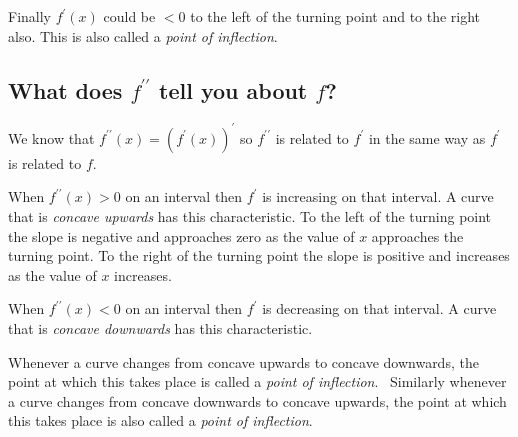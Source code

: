 Finally $f^{ \prime } (x)$ could be $ <0$ to the left of the turning point and to the right also. This is also called a \emph{point
of inflection}. 

\subsection{What does $f^{ \prime  \prime }$ tell you about $f$?}
We know that $f^{ \prime  \prime } (x) =\left (f^{ \prime } (x)\right )^{ \prime }$ so $f^{ \prime  \prime }$ is related to $f^{ \prime }$ in the same way as $f^{ \prime }$ is related to $f$. 

When $f^{ \prime  \prime } (x) >0$ on an interval then $f^{ \prime }$ is increasing on that interval. A curve that is \emph{concave upwards}
has this characteristic. To the left of the turning point the slope is negative and approaches zero as the value
of $x$ approaches the turning point. To the right of the turning point the slope is positive
and increases as the value of $x$ increases. 

When $f^{ \prime  \prime } (x) <0$ on an interval then $f^{ \prime }$ is decreasing on that interval. A curve that is \emph{concave downwards} has this characteristic. 

Whenever
a curve changes from concave upwards to concave downwards, the point at which this takes place is called a \emph{point of inflection}.
\ Similarly whenever a curve changes from concave downwards to concave upwards, the point at which this takes
place is also called a \emph{point of inflection}. 

